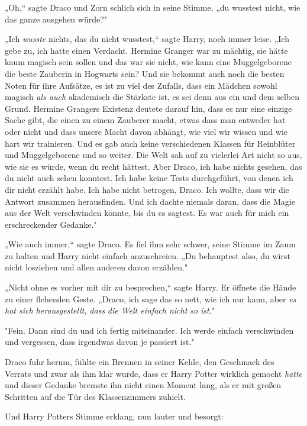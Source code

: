 {„Oh,“ sagte Draco und Zorn schlich sich in seine Stimme, „du wusstest nicht, wie das ganze ausgehen würde?"

„Ich \emph{wusste} nichts, das du nicht wusstest,“ sagte Harry, noch immer leise. „Ich gebe zu, ich hatte einen Verdacht. Hermine Granger war zu mächtig, sie hätte kaum magisch sein sollen und das war sie nicht, wie kann eine Muggelgeborene die beste Zauberin in Hogwarts sein? Und sie bekommt auch noch die besten Noten für ihre Aufsätze, es ist zu viel des Zufalls, dass ein Mädchen sowohl magisch \emph{als auch} akademisch die Stärkste ist, es sei denn aus ein und dem selben Grund. Hermine Grangers Existenz deutete darauf hin, dass es nur eine einzige Sache gibt, die einen zu einem Zauberer macht, etwas dass man entweder hat oder nicht und dass unsere Macht davon abhängt, wie viel wir wissen und wie hart wir trainieren. Und es gab auch keine verschiedenen Klassen für Reinblüter und Muggelgeborene und so weiter. Die Welt sah auf zu vielerlei Art nicht so aus, wie sie es würde, wenn du recht hättest. Aber Draco, ich habe nichts gesehen, das du nicht auch sehen konntest. Ich habe keine Tests durchgeführt, von denen ich dir nicht erzählt habe. Ich habe nicht betrogen, Draco. Ich wollte, dass wir die Antwort zusammen herausfinden. Und ich dachte niemals daran, dass die Magie aus der Welt verschwinden könnte, bis du es sagtest. Es war auch für mich ein erschreckender Gedanke."

„Wie auch immer,“ sagte Draco. Es fiel ihm sehr schwer, seine Stimme im Zaum zu halten und Harry nicht einfach anzuschreien. „Du behauptest also, du wirst nicht losziehen und allen anderen davon erzählen."

„Nicht ohne es vorher mit dir zu besprechen,“ sagte Harry. Er öffnete die Hände zu einer flehenden Geste. „Draco, ich sage das so nett, wie ich nur kann, aber \emph{es hat sich herausgestellt,} \emph{dass} \emph{die Welt einfach nicht so} \emph{ist.}"

"Fein. Dann sind du und ich fertig miteinander. Ich werde einfach verschwinden und vergessen, dass irgendwas davon je passiert ist."

Draco fuhr herum, fühlte ein Brennen in seiner Kehle, den Geschmack des Verrats und zwar als ihm klar wurde, dass er Harry Potter wirklich gemocht \emph{hatte} und dieser Gedanke bremste ihn nicht einen Moment lang, als er mit großen Schritten auf die Tür des Klassenzimmers zuhielt.

Und Harry Potters Stimme erklang, nun lauter und besorgt:

}
